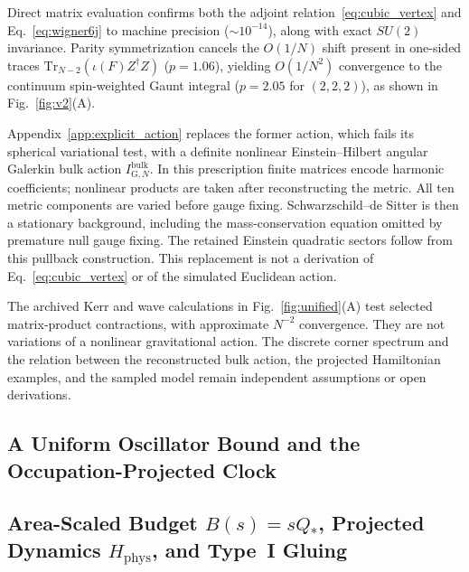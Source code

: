 \documentclass[onecolumn,11pt,aps,prd,amsmath,amssymb,nofootinbib,floatfix]{revtex4-2}
\newcommand{\Tr}{\mathrm{Tr}}
\begin{document}
Direct matrix evaluation confirms both the adjoint relation~\eqref{eq:cubic_vertex} and Eq.~\eqref{eq:wigner6j} to machine precision ($\sim 10^{-14}$), along with exact $SU(2)$ invariance. Parity symmetrization cancels the $O(1/N)$ shift present in one-sided traces $\Tr_{N-2}(\iota(F)Z^\dagger Z)$ ($p=1.06$), yielding $O(1/N^2)$ convergence to the continuum spin-weighted Gaunt integral ($p=2.05$ for $(2,2,2)$), as shown in Fig.~\ref{fig:v2}(A).

Appendix~\ref{app:explicit_action} replaces the former action, which fails its spherical variational test, with a definite nonlinear Einstein--Hilbert angular Galerkin bulk action $I_{\mathrm{G},N}^{\mathrm{bulk}}$. In this prescription finite matrices encode harmonic coefficients; nonlinear products are taken after reconstructing the metric. All ten metric components are varied before gauge fixing. Schwarzschild--de Sitter is then a stationary background, including the mass-conservation equation omitted by premature null gauge fixing. The retained Einstein quadratic sectors follow from this pullback construction. This replacement is not a derivation of Eq.~\eqref{eq:cubic_vertex} or of the simulated Euclidean action.

The archived Kerr and wave calculations in Fig.~\ref{fig:unified}(A) test selected matrix-product contractions, with approximate $N^{-2}$ convergence. They are not variations of a nonlinear gravitational action. The discrete corner spectrum and the relation between the reconstructed bulk action, the projected Hamiltonian examples, and the sampled model remain independent assumptions or open derivations.

\subsection{A Uniform Oscillator Bound and the Occupation-Projected Clock}\label{sec:unified_clock}



\subsection{Area-Scaled Budget $B(s)=s Q_*$, Projected Dynamics $H_{\mathrm{phys}}$, and Type~I Gluing}\label{sec:unified_H}
\end{document}
